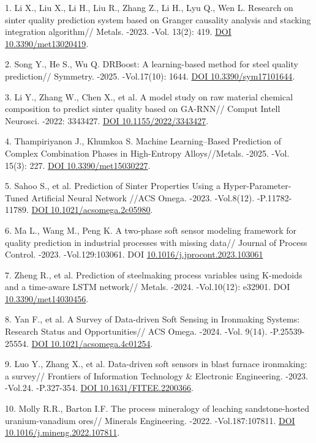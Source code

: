 \begin{refs}
1. Li X., Liu X., Li H., Liu R., Zhang Z., Li H., Lyu Q., Wen L.
Research on sinter quality prediction system based on Granger causality
analysis and stacking integration algorithm// Metals. -2023. -Vol.
13(2): 419. \href{https://doi.org/10.3390/met13020419}{DOI
10.3390/met13020419}.

2. Song Y., He S., Wu Q. DRBoost: A learning-based method for steel
quality prediction// Symmetry. -2025. -Vol.17(10): 1644.
\href{https://doi.org/10.3390/sym17101644}{DOI 10.3390/sym17101644}.

3. Li Y., Zhang W., Chen X., et al. A model study on raw material
chemical composition to predict sinter quality based on GA-RNN// Comput
Intell Neurosci. -2022: 3343427.
\href{https://doi.org/10.3390/ma15082746}{DOI 10.1155/2022/3343427}.

4. Thampiriyanon J., Khumkoa S. Machine Learning--Based Prediction of
Complex Combination Phases in High-Entropy Alloys//Metals. -2025. -Vol.
15(3): 227. \href{https://doi.org/10.3390/met15030227}{DOI
10.3390/met15030227}.

5. Sahoo S., et al. Prediction of Sinter Properties Using a
Hyper-Parameter-Tuned Artificial Neural Network //ACS Omega. -2023.
-Vol.8(12). -P.11782-11789.
\href{https://doi.org/10.1021/acsomega.2c05980}{DOI
10.1021/acsomega.2c05980}.

6. Ma L., Wang M., Peng K. A two-phase soft sensor modeling framework
for quality prediction in industrial processes with missing data//
Journal of Process Control. -2023. -Vol.129:103061. DOI
\href{https://doi.org/10.1016/j.jprocont.2023.103061}{10.1016/j.jprocont.2023.103061}

7. Zheng R., et al. Prediction of steelmaking process variables using
K-medoids and a time-aware LSTM network// Metals. -2024. -Vol.10(12):
e32901. DOI
\href{https://doi.org/10.3390/met14030456}{10.3390/met14030456}.

8. Yan F., et al. A Survey of Data-driven Soft Sensing in Ironmaking
Systems: Research Status and Opportunities// ACS Omega. -2024. -Vol.
9(14). -P.25539-25554.
\href{https://doi.org/10.1021/acsomega.4c01254}{DOI
10.1021/acsomega.4c01254}.

9. Luo Y., Zhang X., et al. Data-driven soft sensors in blast furnace
ironmaking: a survey// Frontiers of Information Technology \& Electronic
Engineering. -2023. -Vol.24. -P.327-354.
\href{https://doi.org/10.1631/FITEE.2200366}{DOI 10.1631/FITEE.2200366}.

10. Molly R.R., Barton I.F. The process mineralogy of leaching
sandstone-hosted uranium-vanadium ores// Minerals Engineering. -2022.
-Vol.187:107811.
\href{https://doi.org/10.1016/j.mineng.2022.107811}{DOI
10.1016/j.mineng.2022.107811}.


\end{refs}
